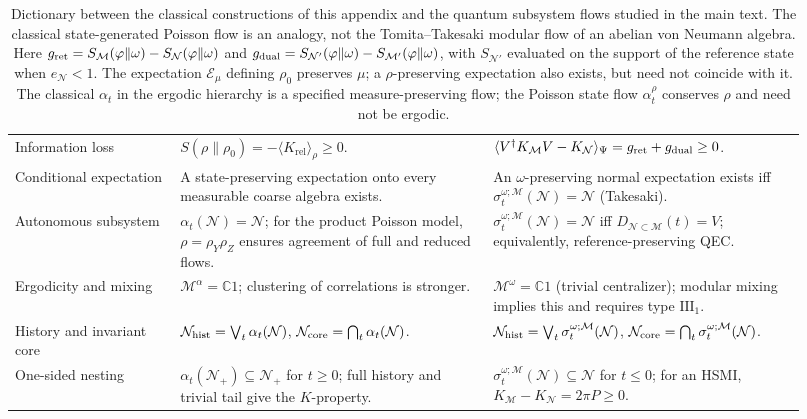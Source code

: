 \documentclass[a4paper,11pt]{article}
\theoremstyle{definition}
\newcommand{\mN}{\mathcal{N}}
\newcommand{\mM}{\mathcal{M}}
\newcommand{\mE}{\mathcal{E}}
\begin{document}
\begin{table}[htbp]
\begin{tabular}{@{}>{\raggedright\arraybackslash}p{0.19\linewidth}
                >{\raggedright\arraybackslash}p{0.365\linewidth}
                >{\raggedright\arraybackslash}p{0.365\linewidth}@{}}
Information loss &
$S(\rho\|\rho_0)=-\langle K_{\mathrm{rel}}\rangle_\rho\ge0$. &
$\langle V^\dagger K_{\mM}V-K_{\mN}\rangle_\Psi
=g_{\rm ret}+g_{\rm dual}\ge0$. \\
\addlinespace[2pt]
Conditional expectation &
A state-preserving expectation onto every measurable coarse algebra exists. &
An $\omega$-preserving normal expectation exists iff
$\sigma_t^{\omega;\mM}(\mN)=\mN$ (Takesaki). \\
\addlinespace[2pt]
Autonomous subsystem &
$\alpha_t(\mN)=\mN$;
for the product Poisson model, $\rho=\rho_Y\rho_Z$ ensures agreement of full and reduced flows. &
$\sigma_t^{\omega;\mM}(\mN)=\mN$ iff
$D_{\mN\subset\mM}(t)=V$; equivalently, reference-preserving QEC. \\
\addlinespace[2pt]
Ergodicity and mixing &
$\mM^\alpha=\mathbb C1$;
clustering of correlations is stronger. &
$\mM^\omega=\mathbb C1$ (trivial centralizer);
modular mixing implies this and requires type $\mathrm{III}_1$. \\
\addlinespace[2pt]
History and invariant core &
$\mN_{\rm hist}=\bigvee_t\alpha_t(\mN)$,
$\mN_{\rm core}=\bigcap_t\alpha_t(\mN)$. &
$\mN_{\rm hist}=\bigvee_t\sigma_t^{\omega;\mM}(\mN)$,
$\mN_{\rm core}=\bigcap_t\sigma_t^{\omega;\mM}(\mN)$. \\
\addlinespace[2pt]
One-sided nesting &
$\alpha_t(\mN_+)\subseteq\mN_+$ for $t\ge0$;
full history and trivial tail give the $K$-property. &
$\sigma_t^{\omega;\mM}(\mN)\subseteq\mN$ for $t\le0$;
for an HSMI, $K_{\mM}-K_{\mN}=2\pi P\ge0$. \\
\bottomrule
\end{tabular}
\endgroup
\vspace{0.3em}

\caption{Dictionary between the classical constructions of this appendix and the
quantum subsystem flows studied in the main text. The classical state-generated
Poisson flow is an analogy, not the Tomita--Takesaki modular flow of an
abelian von Neumann algebra. Here $g_{\rm ret}=S_{\mM}(\varphi\|\omega)-S_{\mN}(\varphi\|\omega)$ and
$g_{\rm dual}=S_{\mN'}(\varphi\|\omega)-S_{\mM'}(\varphi\|\omega)$, with
$S_{\mN'}$ evaluated on the support of the reference state when $e_{\mN}<1$.
The expectation $\mE_\mu$ defining $\rho_0$ preserves $\mu$; a
$\rho$-preserving expectation also exists, but need not coincide with it.
The classical $\alpha_t$ in the ergodic hierarchy is a specified
measure-preserving flow; the Poisson state flow $\alpha_t^\rho$ conserves
$\rho$ and need not be ergodic.}
\end{table}
\end{document}
